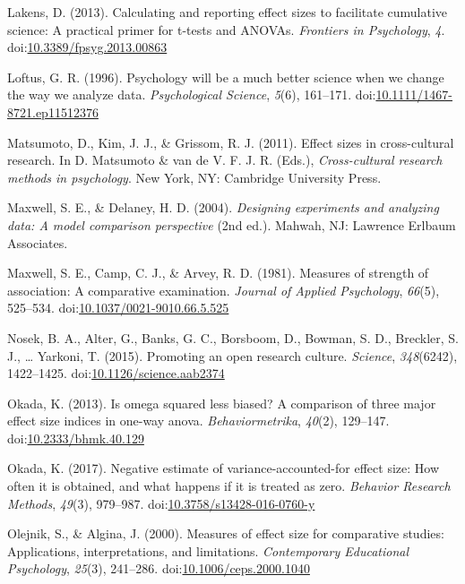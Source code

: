 \documentclass[english,man]{apa6}
\theoremstyle{definition}
\theoremstyle{definition}
\theoremstyle{definition}
\theoremstyle{remark}
\begin{document}
\hypertarget{ref-Lakens2013}{}
Lakens, D. (2013). Calculating and reporting effect sizes to facilitate
cumulative science: A practical primer for t-tests and ANOVAs.
\emph{Frontiers in Psychology}, \emph{4}.
doi:\href{https://doi.org/10.3389/fpsyg.2013.00863}{10.3389/fpsyg.2013.00863}

\hypertarget{ref-Loftus1996}{}
Loftus, G. R. (1996). Psychology will be a much better science when we
change the way we analyze data. \emph{Psychological Science},
\emph{5}(6), 161--171.
doi:\href{https://doi.org/10.1111/1467-8721.ep11512376}{10.1111/1467-8721.ep11512376}

\hypertarget{ref-Matsumoto2011}{}
Matsumoto, D., Kim, J. J., \& Grissom, R. J. (2011). Effect sizes in
cross-cultural research. In D. Matsumoto \& van de V. F. J. R. (Eds.),
\emph{Cross-cultural research methods in psychology}. New York, NY:
Cambridge University Press.

\hypertarget{ref-Maxwell2004}{}
Maxwell, S. E., \& Delaney, H. D. (2004). \emph{Designing experiments
and analyzing data: A model comparison perspective} (2nd ed.). Mahwah,
NJ: Lawrence Erlbaum Associates.

\hypertarget{ref-Maxwell1981}{}
Maxwell, S. E., Camp, C. J., \& Arvey, R. D. (1981). Measures of
strength of association: A comparative examination. \emph{Journal of
Applied Psychology}, \emph{66}(5), 525--534.
doi:\href{https://doi.org/10.1037/0021-9010.66.5.525}{10.1037/0021-9010.66.5.525}

\hypertarget{ref-Nosek2015}{}
Nosek, B. A., Alter, G., Banks, G. C., Borsboom, D., Bowman, S. D.,
Breckler, S. J., \ldots{} Yarkoni, T. (2015). Promoting an open research
culture. \emph{Science}, \emph{348}(6242), 1422--1425.
doi:\href{https://doi.org/10.1126/science.aab2374}{10.1126/science.aab2374}

\hypertarget{ref-Okada2013}{}
Okada, K. (2013). Is omega squared less biased? A comparison of three
major effect size indices in one-way anova. \emph{Behaviormetrika},
\emph{40}(2), 129--147.
doi:\href{https://doi.org/10.2333/bhmk.40.129}{10.2333/bhmk.40.129}

\hypertarget{ref-Okada2016}{}
Okada, K. (2017). Negative estimate of variance-accounted-for effect
size: How often it is obtained, and what happens if it is treated as
zero. \emph{Behavior Research Methods}, \emph{49}(3), 979--987.
doi:\href{https://doi.org/10.3758/s13428-016-0760-y}{10.3758/s13428-016-0760-y}

\hypertarget{ref-Olejnik2000}{}
Olejnik, S., \& Algina, J. (2000). Measures of effect size for
comparative studies: Applications, interpretations, and limitations.
\emph{Contemporary Educational Psychology}, \emph{25}(3), 241--286.
doi:\href{https://doi.org/10.1006/ceps.2000.1040}{10.1006/ceps.2000.1040}
\end{document}
